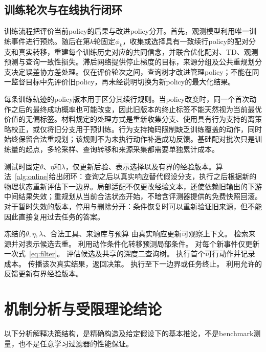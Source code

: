 \documentclass[sigconf,anonymous,review]{acmart}
\theoremstyle{zhplain}
\begin{document}
\subsection{训练轮次与在线执行闭环}
训练流程把评价当前policy的后果与改进policy分开。首先，观测模型利用唯一训练事件进行预热。随后在第\(k\)轮固定\(\phi_k\)，收集或选择具有一致续行policy的配对分支和真实转移，重建每个训练历史对应的共同信念，并联合优化配对、TD、观测预测与查询一致性损失。滞后网络提供停止梯度的目标，来源分组及公共重规划分支决定误差协方差处理。仅在评价轮次之间，查询树才改进管理policy；不能在同一监督目标中先评价旧policy，再未经说明切换为新policy的最大化结果。

每条训练轨迹的policy版本用于区分其续行规则。当policy改变时，同一个首次动作之后的最终成功概率也可能改变，因此旧版本的终止标签不能天然视为当前最优价值的无偏标签。材料规定的处理方式是重新收集分支、使用具有行为支持的离策略校正，或仅将旧分支用于预训练。行为支持掩码限制缺乏训练覆盖的动作，同时始终保留合法重规划；该规则不为未执行动作补造成功反馈。基础配对批次只是训练量的起点，多轮采样、查询转移和来源采集都需要单独累计成本。

测试时固定\(\theta\)、\(\eta\)和\(\lambda\)，仅更新后验、表示选择以及有界的经验版本。算法~\ref{alg:online}给出闭环：查询之后以真实响应替代假设分支，执行之后根据新的物理状态重新评估下一边界。局部适配不仅更改经验文本，还使依赖旧输出的下游中间结果失效；重规划从当前合法状态开始，不暗含评测器提供的免费快照回滚。对于暂时失效的版本，停用与删除分开：条件恢复时可以重新验证旧来源，但不能因此直接复用过去任务的答案。

\begin{algorithm}[t]
\caption{DEUL在线控制}
\label{alg:online}
\begin{algorithmic}[1]
\Require 冻结的\(\theta,\eta,\lambda\)、合法工具、来源库与预算
\State 由真实响应更新可观察上下文。
\State 检索来源并对表示候选去重。
\State 利用动作条件化转移预测局部条件。
\State 对每个新事件仅更新一次式~\eqref{eq:filter}。
\State 评估候选及共享的深度二查询树。
\State 执行首个可行动作并记录成本。
\State 传播该次真实结果，返回决策。
\Else
\State 执行至下一边界或任务终止。
\EndIf
\EndWhile
\State 利用允许的反馈更新有界经验版本。
\end{algorithmic}
\end{algorithm}


\section{机制分析与受限理论结论}
\label{app:analysis}
以下分析解释决策结构，是精确构造及给定假设下的基本推论，不是benchmark测量，也不是任意学习过滤器的性能保证。
\end{document}
